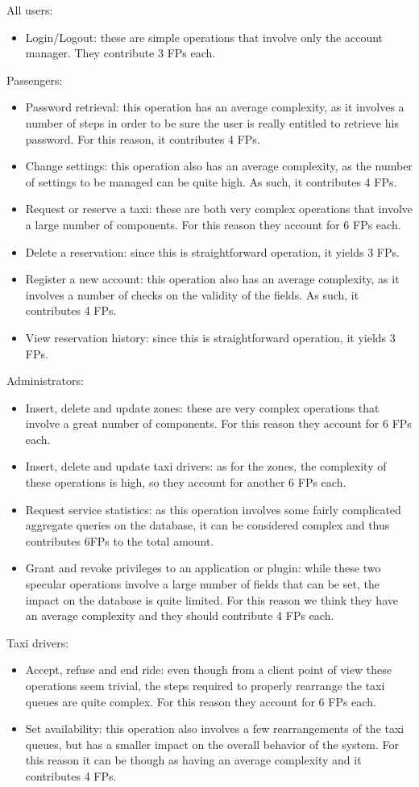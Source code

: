 All users:
\begin{itemize}
	\item Login/Logout: these are simple operations that involve only the account manager. They contribute 3 FPs each.
\end{itemize}
Passengers:
\begin{itemize}
	\item Password retrieval: this operation has an average complexity, as it involves a number of steps in order to be sure the user is really entitled to retrieve his password. For this reason, it contributes 4 FPs.
	\item Change settings: this operation also has an average complexity, as the number of settings to be managed can be quite high. As such, it contributes 4 FPs.
	\item Request or reserve a taxi: these are both very complex operations that involve a large number of components. For this reason they account for 6 FPs each.
	\item Delete a reservation: since this is straightforward operation, it yields 3 FPs. 
	\item Register a new account: this operation also has an average complexity, as it involves a number of checks on the validity of the fields. As such, it contributes 4 FPs.
	\item View reservation history: since this is straightforward operation, it yields 3 FPs. 
\end{itemize}
Administrators:
\begin{itemize}
	\item Insert, delete and update zones: these are very complex operations that involve a great number of components. For this reason they account for 6 FPs each.
	\item Insert, delete and update taxi drivers: as for the zones, the complexity of these operations is high, so they account for another 6 FPs each. 
	\item Request service statistics: as this operation involves some fairly complicated aggregate queries on the database, it can be considered complex and thus contributes 6FPs to the total amount.
	\item Grant and revoke privileges to an application or plugin: while these two specular operations involve a large number of fields that can be set, the impact on the database is quite limited. For this reason we think they have an average complexity and they should contribute 4 FPs each.
\end{itemize}
Taxi drivers:
\begin{itemize}
	\item Accept, refuse and end ride: even though from a client point of view these operations seem trivial, the steps required to properly rearrange the taxi queues are quite complex. For this reason they account for 6 FPs each.
	\item Set availability: this operation also involves a few rearrangements of the taxi queues, but has a smaller impact on the overall behavior of the system. For this reason it can be though as having an average complexity and it contributes 4 FPs.
\end{itemize}


